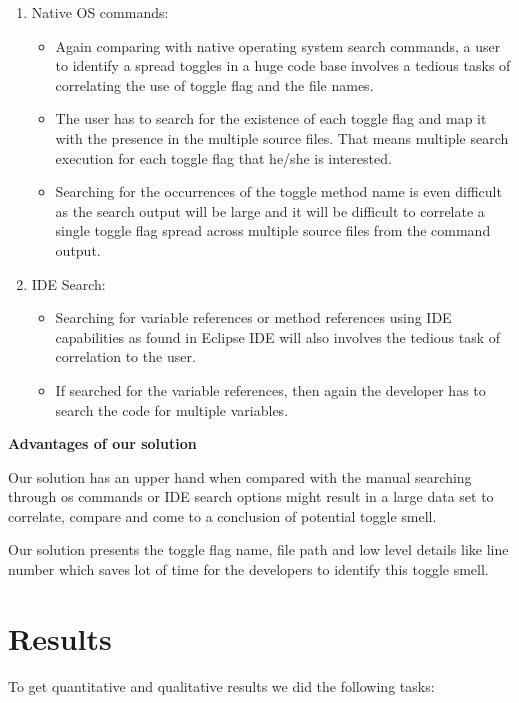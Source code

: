 \documentclass[conference]{IEEEtran}
\begin{document}
\begin{enumerate}
\item{Native OS commands:

\begin{itemize}
\item Again comparing with native operating system search commands, a user to identify a spread toggles in a huge code base involves a tedious tasks of correlating the use of toggle flag and the file names.
\item The user has to search for the existence of each toggle flag and map it with the presence in the multiple source files. That means multiple search execution for each toggle flag that he/she is interested.
\item Searching for the occurrences of the toggle method name is even difficult as the search output will be large and it will be difficult to correlate a single toggle flag spread across multiple source files from the command output.
\end{itemize}
}

\item{IDE Search:
\begin{itemize}
\item Searching for variable references or method references using IDE capabilities as found in Eclipse IDE will also involves the tedious task of correlation to the user.
\item If searched for the variable references, then again the developer has to search the code for multiple variables.
\end{itemize}
}
\end{enumerate}

\textbf{Advantages of our solution}

Our solution has an upper hand when compared with the manual searching through os commands or IDE search options might result in a large data set to correlate, compare and come to a conclusion of potential toggle smell.

Our solution presents the toggle flag name, file path and low level details like line number which saves lot of time for the developers to identify this toggle smell.

\section{Results}
\label{threats}

To get quantitative and qualitative results we did the following tasks:
\end{document}
